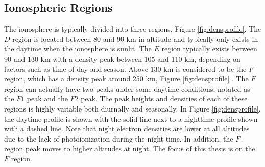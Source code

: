 \subsection{Ionospheric Regions}
\label{sec:ionosphere_regions}
The ionosphere is typically divided into three regions, Figure \ref{fig:densprofile}.  The \(D\) region is located between 80 and 90 km in altitude and typically only exists in the daytime when the ionosphere is sunlit.  The \(E\) region typically exists between 90 and 130 km with a density peak between 105 and 110 km, depending on factors such as time of day and season.  Above 130 km is considered to be the \(F\) region, which has a density peak around 250 km, Figure \ref{fig:densprofile} \citep{Kivelson1995}.  The \(F\) region can actually have two peaks under some daytime conditions, notated as the \(F1\) peak and the \(F2\) peak.  The peak heights and densities of each of these regions is highly variable both diurnally and seasonally.  In Figure \ref{fig:densprofile}, the daytime profile is shown with the solid line next to a nighttime profile shown with a dashed line.  Note that night electron densities are lower at all altitudes due to the lack of photoionization during the night time.  In addition, the \(F\)-region peak moves to higher altitudes at night.  The focus of this thesis is on the \(F\) region.

